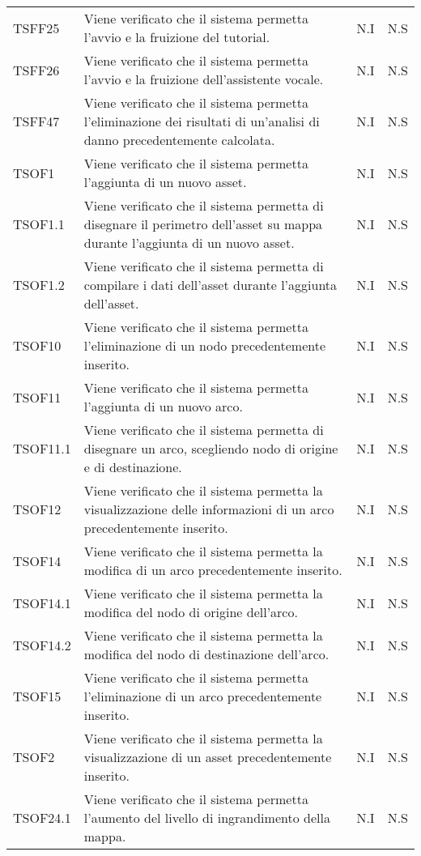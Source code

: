 \begin{longtable}{p{1.5cm}!{\VRule[1pt]}p{5cm}!{\VRule[1pt]}p{1cm}!{\VRule[1pt]}p{1cm}}
		TSFF25 & Viene verificato che il sistema permetta l'avvio e la fruizione del tutorial. & N.I & N.S \\ 
		TSFF26 & Viene verificato che il sistema permetta l'avvio e la fruizione dell'assistente vocale. & N.I & N.S \\ 
		TSFF47 & Viene verificato che il sistema permetta l'eliminazione dei risultati di un'analisi di danno precedentemente calcolata. & N.I & N.S \\ 
		TSOF1 & Viene verificato che il sistema permetta l'aggiunta di un nuovo asset. & N.I & N.S \\ 
		TSOF1.1 & Viene verificato che il sistema permetta di disegnare il perimetro dell'asset su mappa durante l'aggiunta di un nuovo asset. & N.I & N.S \\ 
		TSOF1.2 & Viene verificato che il sistema permetta di compilare i dati dell'asset durante l'aggiunta dell'asset. & N.I & N.S \\ 
		TSOF10 & Viene verificato che il sistema permetta l'eliminazione di un nodo precedentemente inserito. & N.I & N.S \\ 
		TSOF11 & Viene verificato che il sistema permetta l'aggiunta di un nuovo arco. & N.I & N.S \\ 
		TSOF11.1 & Viene verificato che il sistema permetta di disegnare un arco, scegliendo nodo di origine e di destinazione. & N.I & N.S \\ 
		TSOF12 & Viene verificato che il sistema permetta la visualizzazione delle informazioni di un arco precedentemente inserito. & N.I & N.S \\ 
		TSOF14 & Viene verificato che il sistema permetta la modifica di un arco precedentemente inserito. & N.I & N.S \\ 
		TSOF14.1 & Viene verificato che il sistema permetta la modifica del nodo di origine dell'arco. & N.I & N.S \\ 
		TSOF14.2 & Viene verificato che il sistema permetta la modifica del nodo di destinazione dell'arco. & N.I & N.S \\ 
		TSOF15 & Viene verificato che il sistema permetta l'eliminazione di un arco precedentemente inserito. & N.I & N.S \\ 
		TSOF2 & Viene verificato che il sistema permetta la visualizzazione di un asset precedentemente inserito. & N.I & N.S \\ 
		TSOF24.1 & Viene verificato che il sistema permetta l'aumento del livello di ingrandimento della mappa. & N.I & N.S \\ 

\end{longtable}

